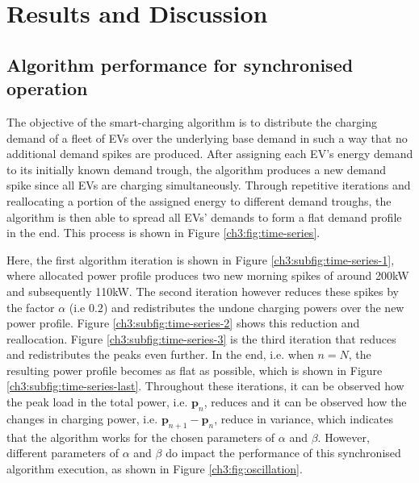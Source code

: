 \section{Results and Discussion}
\label{ch3:sec:results}

\subsection{Algorithm performance for synchronised operation}
\label{ch3:subsec:algorithm-performance-for-synchronised-operation}

The objective of the smart-charging algorithm is to distribute the charging demand of a fleet of EVs over the underlying base demand in such a way that no additional demand spikes are produced.
After assigning each EV's energy demand to its initially known demand trough, the algorithm produces a new demand spike since all EVs are charging simultaneously.
Through repetitive iterations and reallocating a portion of the assigned energy to different demand troughs, the algorithm is then able to spread all EVs' demands to form a flat demand profile in the end.
This process is shown in Figure \ref{ch3:fig:time-series}.



Here, the first algorithm iteration is shown in Figure \ref{ch3:subfig:time-series-1}, where allocated power profile produces two new morning spikes of around 200kW and subsequently 110kW.
The second iteration however reduces these spikes by the factor $\alpha$ (i.e $0.2$) and redistributes the undone charging powers over the new power profile.
Figure \ref{ch3:subfig:time-series-2} shows this reduction and reallocation.
Figure \ref{ch3:subfig:time-series-3} is the third iteration that reduces and redistributes the peaks even further.
In the end, i.e. when $n=N$, the resulting power profile becomes as flat as possible, which is shown in Figure \ref{ch3:subfig:time-series-last}.
Throughout these iterations, it can be observed how the peak load in the total power, i.e. $\textbf{p}_n$, reduces and it can be observed how the changes in charging power, i.e. $\textbf{p}_{n+1}-\textbf{p}_n$, reduce in variance, which indicates that the algorithm works for the chosen parameters of $\alpha$ and $\beta$.
However, different parameters of $\alpha$ and $\beta$ do impact the performance of this synchronised algorithm execution, as shown in Figure \ref{ch3:fig:oscillation}.



